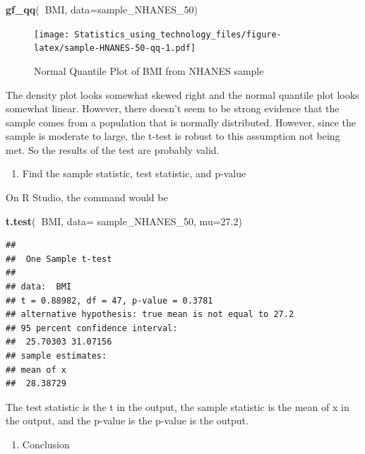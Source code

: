 \documentclass[
]{book}
\newenvironment{Shaded}{\begin{snugshade}}{\end{snugshade}}
\newcommand{\DataTypeTok}[1]{\textcolor[rgb]{0.13,0.29,0.53}{#1}}
\newcommand{\DecValTok}[1]{\textcolor[rgb]{0.00,0.00,0.81}{#1}}
\newcommand{\FloatTok}[1]{\textcolor[rgb]{0.00,0.00,0.81}{#1}}
\newcommand{\KeywordTok}[1]{\textcolor[rgb]{0.13,0.29,0.53}{\textbf{#1}}}
\newcommand{\NormalTok}[1]{#1}
\newcommand{\OperatorTok}[1]{\textcolor[rgb]{0.81,0.36,0.00}{\textbf{#1}}}
\providecommand{\tightlist}{%
  \setlength{\itemsep}{0pt}\setlength{\parskip}{0pt}}
\begin{document}
\begin{Shaded}
\begin{Highlighting}[]
\KeywordTok{gf_qq}\NormalTok{(}\OperatorTok{~}\NormalTok{BMI, }\DataTypeTok{data=}\NormalTok{sample_NHANES_}\DecValTok{50}\NormalTok{)}
\end{Highlighting}
\end{Shaded}

\begin{figure}
\centering
\texttt{[image: Statistics\_using\_technology\_files/figure-latex/sample-HNANES-50-qq-1.pdf]}
\caption{\label{fig:sample-HNANES-50-qq}Normal Quantile Plot of BMI from NHANES sample}
\end{figure}

The density plot looks somewhat skewed right and the normal quantile plot looks somewhat linear. However, there doesn't seem to be strong evidence that the sample comes from a population that is normally distributed. However, since the sample is moderate to large, the t-test is robust to this assumption not being met. So the results of the test are probably valid.

\begin{enumerate}
\def\labelenumi{\arabic{enumi}.}
\setcounter{enumi}{3}
\tightlist
\item
  Find the sample statistic, test statistic, and p-value
\end{enumerate}

On R Studio, the command would be

\begin{Shaded}
\begin{Highlighting}[]
\KeywordTok{t.test}\NormalTok{(}\OperatorTok{~}\NormalTok{BMI, }\DataTypeTok{data=}\NormalTok{ sample_NHANES_}\DecValTok{50}\NormalTok{, }\DataTypeTok{mu=}\FloatTok{27.2}\NormalTok{)}
\end{Highlighting}
\end{Shaded}

\begin{verbatim}
## 
## 	One Sample t-test
## 
## data:  BMI
## t = 0.88982, df = 47, p-value = 0.3781
## alternative hypothesis: true mean is not equal to 27.2
## 95 percent confidence interval:
##  25.70303 31.07156
## sample estimates:
## mean of x 
##  28.38729
\end{verbatim}

The test statistic is the t in the output, the sample statistic is the mean of x in the output, and the p-value is the p-value is the output.

\begin{enumerate}
\def\labelenumi{\arabic{enumi}.}
\setcounter{enumi}{4}
\tightlist
\item
  Conclusion
\end{enumerate}
\end{document}
